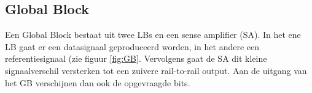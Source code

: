 \subsection{Global Block}
Een Global Block bestaat uit twee LBs en een sense amplifier (SA). In het ene LB gaat er een datasignaal geproduceerd worden, in het andere een referentiesignaal (zie figuur \ref{fig:GB}. Vervolgens gaat de SA dit kleine signaalverschil versterken tot een zuivere rail-to-rail output.
Aan de uitgang van het GB verschijnen dan ook de opgevraagde bits.
%
%
%
%


